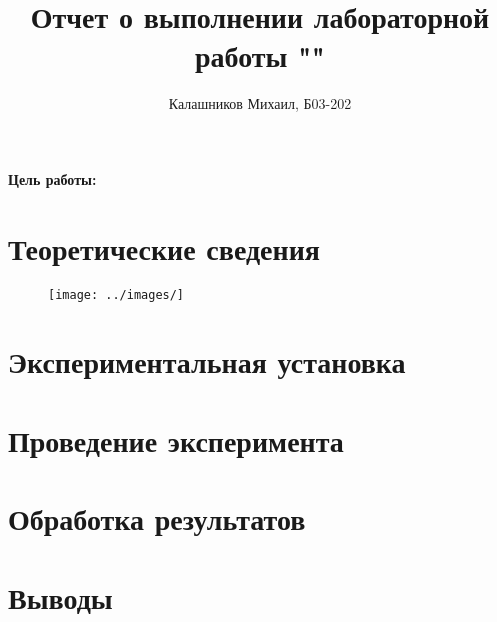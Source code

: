 \documentclass[14pt, a4paper]{report}
\title{\textbf{Отчет о выполнении лабораторной работы ""}}
\author{Калашников Михаил, Б03-202}
\date{}
\begin{document}
\maketitle


\textbf{Цель работы:}
\newline

\section{Теоретические сведения}

\begin{figure}[H]
\centering
\texttt{[image: ../images/]}
\caption{}
\end{figure}

\section{Экспериментальная установка}

\section{Проведение эксперимента}

\section{Обработка результатов}

\section{Выводы}
\end{document}
